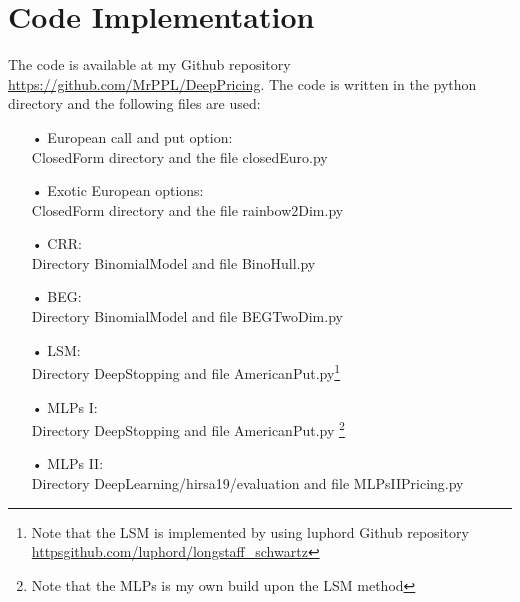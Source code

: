 
\chapter{Code Implementation} %

\label{AppendixD} %

The code is available at my Github repository \href{https://github.com/MrPPL/DeepPricing}{https://github.com/MrPPL/DeepPricing}. The code is written in the python directory and the following files are used:
\begin{enumerate}
\item[•] European call and put option:\\
ClosedForm directory and the file closedEuro.py
\item[•] Exotic European options:\\
ClosedForm directory and the file rainbow2Dim.py
\item[•] CRR:\\
Directory BinomialModel and file BinoHull.py
\item[•] BEG:\\
Directory BinomialModel and file BEGTwoDim.py
\item[•] LSM:\\
Directory DeepStopping and file AmericanPut.py\footnote{Note that the LSM is implemented by using luphord Github repository \href{https://github.com/luphord/longstaff_schwartz}{https\:\/\/github.com/luphord/longstaff\_schwartz}}
\item[•] MLPs I:\\
Directory DeepStopping and file AmericanPut.py \footnote{Note that the MLPs is my own build upon the LSM method}
\item[•] MLPs II:\\
Directory DeepLearning/hirsa19/evaluation and file MLPsIIPricing.py
\end{enumerate}



